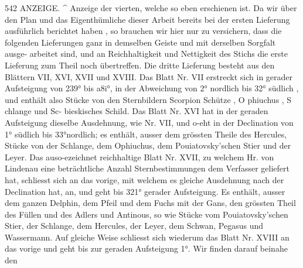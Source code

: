 \documentclass[12pt,a4paper]{article}
\begin{document}
\newpage
542 ANZEIGE. \^{}\newline
Anzeige der vierten, welche so eben erschienen ist. Da wir über den Plan und das Eigenthümliche\newline
dieser Arbeit bereits bei der ersten Lieferung ausführlich berichtet haben , so brauchen wir hier nur zu\newline
versichern, dass die folgenden Lieferungen ganz in demselben Geiste und mit derselben Sorgfalt ausge-\newline
arbeitet sind, und an Reichhaltigkeit und Nettigkeit des Stichs die erste Lieferung zum Theil noch\newline
übertreffen.\newline
Die dritte Lieferung besteht aus den Blättern VII, XVI, XVII und XVIII. Das Blatt Nr. VII\newline
erstreckt sich in gerader Aufsteigung von 239° bis a8i°, in der Abweichung von 2° nordlich bis 32°\newline
südlich , und enthält also Stücke von den Sternbildern Scorpion Schütze , O phiuchus , S chlange und Sc-\newline
bieskisches Schild. Das Blatt Nr. XVI hat in der geraden Aufsteigung dieselbe Ausdehnung, wie Nr. VII,\newline
und o-eht in der Declination von 1° südlich bis 33°nordlich; es enthält, ausser dem grössten Theile des\newline
Hercules, Stücke von der Schlange, dem Ophiuchus, dem Pouiatovsky'schen Stier und der Leyer. Das\newline
auso-ezeichnet reichhaltige Blatt Nr. XVII, zu welchem Hr. von Lindenau eine beträchtliche Anzahl\newline
Sternbestimmungen dem Verfasser geliefert hat, schliesst sich an das vorige, mit welchem es gleiche\newline
Ausdehnung nach der Declination hat, an, und geht bis 321° gerader Aufsteigung. Es enthält, ausser\newline
dem ganzen Delphin, dem Pfeil und dem Fuchs mit der Gans, den grössten Theil des Füllen und des\newline
Adlers und Antinous, so wie Stücke vom Pouiatovsky'schen Stier, der Schlange, dem Hercules, der\newline
Leyer, dem Schwan, Pegasus und Wassermann. Auf gleiche Weise schliesst sich wiederum das Blatt\newline
Nr. XVIII an das vorige und geht bis zur geraden Aufsteigung 1°. Wir finden darauf beinahe den\newline
\end{document}
